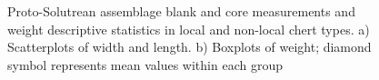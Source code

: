 \documentclass[
  a4paper,
  DIV=11,
  numbers=noendperiod]{scrreprt}
\begin{document}
\begin{figure}


\caption{\label{fig-proto-plots}Proto-Solutrean assemblage blank and
core measurements and weight descriptive statistics in local and
non-local chert types. a) Scatterplots of width and length. b) Boxplots
of weight; diamond symbol represents mean values within each group}

\end{figure}%
\end{document}
